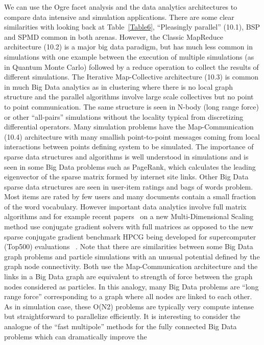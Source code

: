 \documentclass{acm_proc_article-sp}
\begin{document}
We can use the Ogre facet analysis and the data analytics architectures to
compare data intensive and simulation applications. There are some clear
similarities with looking back at Table~\ref{Table6}, ``Pleasingly parallel''
(10.1), BSP and SPMD common in both arenas. However, the Classic MapReduce
architecture (10.2) is a major big data paradigm, but has much less common in
simulations with one example between the execution of multiple simulations (as
in Quantum Monte Carlo) followed by a reduce operation to collect the results
of different simulations. The Iterative Map-Collective architecture (10.3) is
common in much Big Data analytics as in clustering where there is no local
graph structure and the parallel algorithms involve large scale collectives but
no point to point communication. The same structure is seen in N-body (long
range force) or other ``all-pairs'' simulations without the locality typical
from discretizing differential operators. Many simulation problems have the
Map-Communication (10.4) architecture with many smallish point-to-point
messages coming from local interactions between points defining system to be
simulated. The importance of sparse data structures and algorithms is well
understood in simulations and is seen in some Big Data problems such as
PageRank, which calculates the leading eigenvector of the sparse matrix formed
by internet site links. Other Big Data sparse data structures are seen in
user-item ratings and bags of words problem. Most items are rated by few users
and many documents contain a small fraction of the word vocabulary. However
important data analytics involve full matrix algorithms and for example recent
papers~\cite{b31,b32} on a new Multi-Dimensional Scaling method use conjugate
gradient solvers with full matrices as opposed to the new sparse conjugate
gradient benchmark HPCG being developed for supercomputer (Top500) evaluations
~\cite{b17}. Note that there are similarities between some Big Data graph
problems and particle simulations with an unusual potential defined by the
graph node connectivity. Both use the Map-Communication architecture and the
links in a Big Data graph are equivalent to strength of force between the graph
nodes considered as particles. In this analogy, many Big Data problems are
``long range force'' corresponding to a graph where all nodes are linked to
each other. As in simulation case, these O(N2) problems are typically very
compute intense but straightforward to parallelize efficiently. It is
interesting to consider the analogue of the ``fast multipole'' methods for the
fully connected Big Data problems which can dramatically improve the
\end{document}
